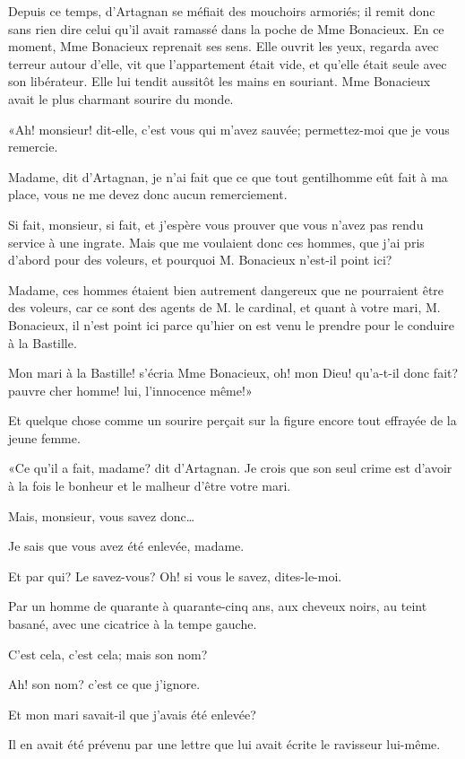 Depuis ce temps, d'Artagnan se méfiait des mouchoirs armoriés; il remit donc sans rien dire celui qu'il avait ramassé dans la poche de Mme Bonacieux. En ce moment, Mme Bonacieux reprenait ses sens. Elle ouvrit les yeux, regarda avec terreur autour d'elle, vit que l'appartement était vide, et qu'elle était seule avec son libérateur. Elle lui tendit aussitôt les mains en souriant. Mme Bonacieux avait le plus charmant sourire du monde. 

«Ah! monsieur! dit-elle, c'est vous qui m'avez sauvée; permettez-moi que je vous remercie. 

\speak  Madame, dit d'Artagnan, je n'ai fait que ce que tout gentilhomme eût fait à ma place, vous ne me devez donc aucun remerciement. 

\speak  Si fait, monsieur, si fait, et j'espère vous prouver que vous n'avez pas rendu service à une ingrate. Mais que me voulaient donc ces hommes, que j'ai pris d'abord pour des voleurs, et pourquoi M. Bonacieux n'est-il point ici? 

\speak  Madame, ces hommes étaient bien autrement dangereux que ne pourraient être des voleurs, car ce sont des agents de M. le cardinal, et quant à votre mari, M. Bonacieux, il n'est point ici parce qu'hier on est venu le prendre pour le conduire à la Bastille. 

\speak  Mon mari à la Bastille! s'écria Mme Bonacieux, oh! mon Dieu! qu'a-t-il donc fait? pauvre cher homme! lui, l'innocence même!» 

Et quelque chose comme un sourire perçait sur la figure encore tout effrayée de la jeune femme. 

«Ce qu'il a fait, madame? dit d'Artagnan. Je crois que son seul crime est d'avoir à la fois le bonheur et le malheur d'être votre mari. 

\speak  Mais, monsieur, vous savez donc\dots 

\speak  Je sais que vous avez été enlevée, madame. 

\speak  Et par qui? Le savez-vous? Oh! si vous le savez, dites-le-moi. 

\speak  Par un homme de quarante à quarante-cinq ans, aux cheveux noirs, au teint basané, avec une cicatrice à la tempe gauche. 

\speak  C'est cela, c'est cela; mais son nom? 

\speak  Ah! son nom? c'est ce que j'ignore. 

\speak  Et mon mari savait-il que j'avais été enlevée? 

\speak  Il en avait été prévenu par une lettre que lui avait écrite le ravisseur lui-même. 

